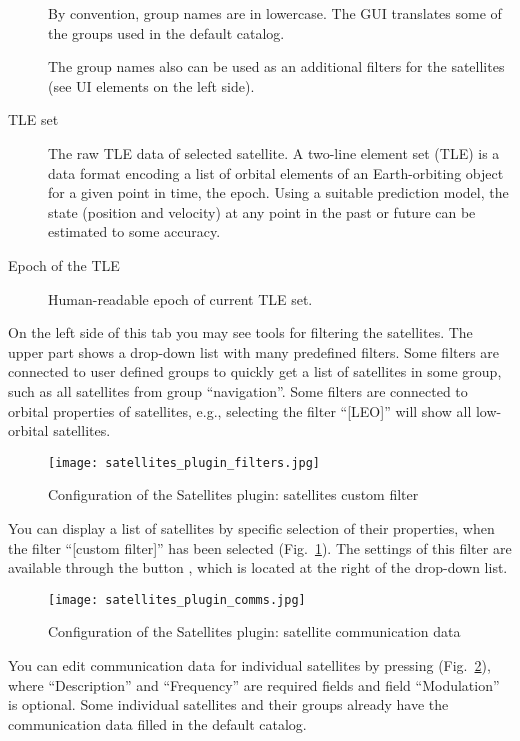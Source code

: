 \begin{description}
By convention, group names are in lowercase. The GUI translates some of the groups used in the default catalog.

The group names also can be used as an additional filters for the satellites (see UI elements on the left side).

\item[TLE set] The raw TLE data of selected satellite. A two-line
  element set (TLE) is a data format encoding a list of orbital
  elements of an Earth-orbiting object for a given point in time, the
  epoch. Using a suitable prediction model, the state (position and
  velocity) at any point in the past or future can be estimated to
  some accuracy.

\item[Epoch of the TLE] Human-readable epoch of current TLE set.
\end{description}


On the left side of this tab you may see tools for filtering the
satellites. The upper part shows a drop-down list with many predefined
filters. Some filters are connected to user defined groups to quickly
get a list of satellites in some group, such as all satellites from
group ``navigation''. Some filters are connected to orbital properties
of satellites, e.g., selecting the filter ``[LEO]'' will show all
low-orbital satellites.

\begin{figure}[t]
	\centering\texttt{[image: satellites\_plugin\_filters.jpg]}
	\caption{Configuration of the Satellites plugin: satellites custom filter}
	\label{fig:plugins:Satellites:Configuration:SatellitesFilter}
\end{figure}

You can display a list of satellites by specific
selection of their properties, when the filter ``[custom filter]'' has
been selected (Fig.~\ref{fig:plugins:Satellites:Configuration:SatellitesFilter}). The
settings of this filter are available through the button
, which is located at the right of
the drop-down list.

\begin{figure}[tb]
	\centering\texttt{[image: satellites\_plugin\_comms.jpg]}
	\caption{Configuration of the Satellites plugin: satellite communication data}
	\label{fig:plugins:Satellites:Configuration:SatellitesComms}
\end{figure}

You can edit communication data for individual satellites by pressing 
(Fig.~\ref{fig:plugins:Satellites:Configuration:SatellitesComms}),
where ``Description'' and ``Frequency'' are required fields and field
``Modulation'' is optional. Some individual satellites and their
groups already have the communication data filled in the default
catalog.

